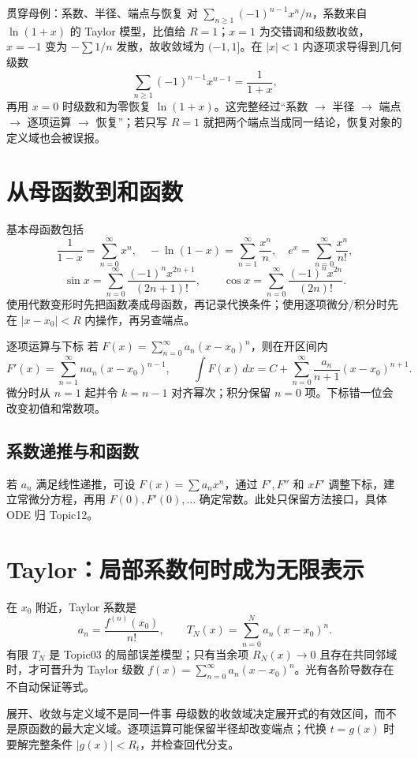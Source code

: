 \documentclass[11pt,a4paper,fontset=fandol]{ctexart}
\begin{document}
\begin{examplebox}{贯穿母例：系数、半径、端点与恢复}
对 $\sum_{n\ge1}(-1)^{n-1}x^n/n$，系数来自 $\ln(1+x)$ 的 Taylor 模型，比值给 $R=1$；$x=1$ 为交错调和级数收敛，$x=-1$ 变为 $-\sum1/n$ 发散，故收敛域为 $(-1,1]$。在 $|x|<1$ 内逐项求导得到几何级数
\[
\sum_{n\ge1}(-1)^{n-1}x^{n-1}=\frac1{1+x},
\]
再用 $x=0$ 时级数和为零恢复 $\ln(1+x)$。这完整经过“系数 $\to$ 半径 $\to$ 端点 $\to$ 逐项运算 $\to$ 恢复”；若只写 $R=1$ 就把两个端点当成同一结论，恢复对象的定义域也会被误报。
\end{examplebox}

\section{从母函数到和函数}
基本母函数包括
\[
\frac1{1-x}=\sum_{n=0}^{\infty}x^n,\quad
-\ln(1-x)=\sum_{n=1}^{\infty}\frac{x^n}{n},\quad
e^x=\sum_{n=0}^{\infty}\frac{x^n}{n!},
\]
\[
\sin x=\sum_{n=0}^{\infty}\frac{(-1)^nx^{2n+1}}{(2n+1)!},\qquad
\cos x=\sum_{n=0}^{\infty}\frac{(-1)^nx^{2n}}{(2n)!}.
\]
使用代数变形时先把函数凑成母函数，再记录代换条件；使用逐项微分/积分时先在 $|x-x_0|<R$ 内操作，再另查端点。

\begin{methodbox}{逐项运算与下标}
若 $F(x)=\sum_{n=0}^{\infty}a_n(x-x_0)^n$，则在开区间内
\[
F'(x)=\sum_{n=1}^{\infty}na_n(x-x_0)^{n-1},\qquad
\int F(x)\,dx=C+\sum_{n=0}^{\infty}\frac{a_n}{n+1}(x-x_0)^{n+1}.
\]
微分时从 $n=1$ 起并令 $k=n-1$ 对齐幂次；积分保留 $n=0$ 项。下标错一位会改变初值和常数项。
\end{methodbox}

\subsection{系数递推与和函数}
若 $a_n$ 满足线性递推，可设 $F(x)=\sum a_nx^n$，通过 $F',F''$ 和 $xF'$ 调整下标，建立常微分方程，再用 $F(0),F'(0),\ldots$ 确定常数。此处只保留方法接口，具体 ODE 归 Topic12。

\section{Taylor：局部系数何时成为无限表示}
在 $x_0$ 附近，Taylor 系数是
\[
a_n=\frac{f^{(n)}(x_0)}{n!},\qquad
T_N(x)=\sum_{n=0}^{N}a_n(x-x_0)^n.
\]
有限 $T_N$ 是 Topic03 的局部误差模型；只有当余项 $R_N(x)\to0$ 且存在共同邻域时，才可晋升为 Taylor 级数 $f(x)=\sum_{n=0}^{\infty}a_n(x-x_0)^n$。光有各阶导数存在不自动保证等式。

\begin{warnbox}{展开、收敛与定义域不是同一件事}
母级数的收敛域决定展开式的有效区间，而不是原函数的最大定义域。逐项运算可能保留半径却改变端点；代换 $t=g(x)$ 时要解完整条件 $|g(x)|<R_t$，并检查回代分支。
\end{warnbox}
\end{document}
